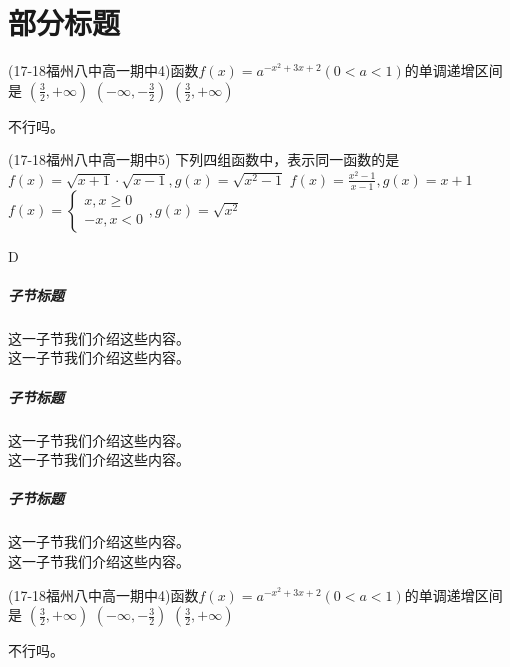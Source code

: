 \documentclass[12pt,UTF8]{ctexart}
\begin{document}
\part{部分标题}
\begin{exercise}
\item (17-18福州八中高一期中4)函数$f(x)=a^{-x^2+3x+2}(0<a<1)$的单调递增区间是\xz
        {$(\frac32,+\infty)$}
        {$(-\infty,-\frac32)$}
        {$(\frac32,+\infty)$}
\begin{answer}
不行吗。
\end{answer}
\item  (17-18福州八中高一期中5) 下列四组函数中，表示同一函数的是\xz
        {$f(x)=\sqrt{x+1}\cdot\sqrt{x-1},g(x)=\sqrt{x^2-1}$}
        {$f(x)=\frac{x^2-1}{x-1},g(x)=x+1$}
        {$f(x)=\begin{cases}x,x\geq0\\-x,x<0\end{cases},g(x)=\sqrt{x^2}$}
\begin{answer}
D
\end{answer}
\end{exercise}
\subsubsection{子节标题}这一子节我们介绍这些内容。\\这一子节我们介绍这些内容。
\subsubsection{子节标题}这一子节我们介绍这些内容。\\这一子节我们介绍这些内容。\\
\subsubsection{子节标题}这一子节我们介绍这些内容。\\这一子节我们介绍这些内容。\\
\begin{exercise}
\item (17-18福州八中高一期中4)函数$f(x)=a^{-x^2+3x+2}(0<a<1)$的单调递增区间是\xz
        {$(\frac32,+\infty)$}
        {$(-\infty,-\frac32)$}
        {$(\frac32,+\infty)$}
\begin{answer}
不行吗。
\end{answer}
\item  (17-18福州八中高一期中5) 下列四组函数中，表示同一函数的是\xz
        {$f(x)=\sqrt{x+1}\cdot\sqrt{x-1},g(x)=\sqrt{x^2-1}$}
        {$f(x)=\frac{x^2-1}{x-1},g(x)=x+1$}
        {$f(x)=\begin{cases}x,x\geq0\\-x,x<0\end{cases},g(x)=\sqrt{x^2}$}
\begin{answer}
D
\end{answer}
\end{exercise}
\end{document}
